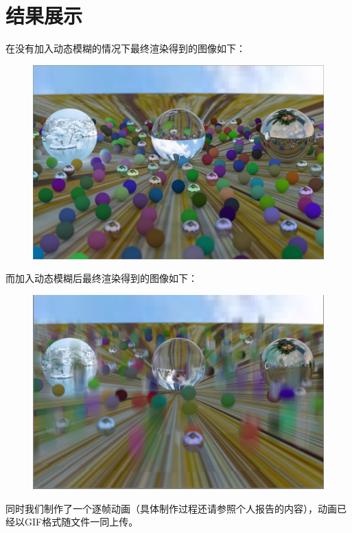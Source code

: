 \documentclass[UTF8, a4paper, 11pt]{article}
\begin{document}
\section{结果展示}
在没有加入动态模糊的情况下最终渲染得到的图像如下：
\begin{figure}[H]
    \centering
    \includegraphics[width=12cm]{Pic/result.png}
\end{figure}
而加入动态模糊后最终渲染得到的图像如下：
\begin{figure}[H]
    \centering
    \includegraphics[width=12cm]{Pic/result_moving.png}
\end{figure}
同时我们制作了一个逐帧动画（具体制作过程还请参照个人报告的内容），动画已经以GIF格式随文件一同上传。
%
%
\end{document}
